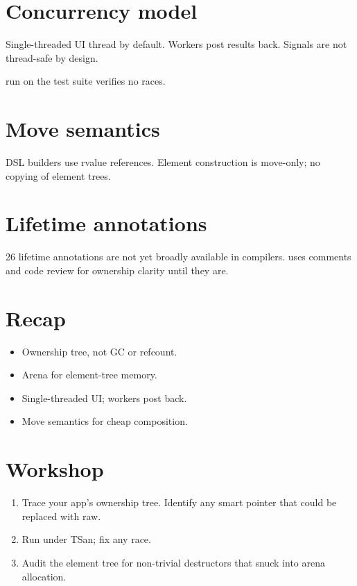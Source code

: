 \section{Concurrency model}

Single-threaded UI thread by default. Workers post results
back. Signals are not thread-safe by design.

 run on the test suite verifies no races.

\section{Move semantics}

DSL builders use rvalue references. Element construction
is move-only; no copying of element trees.

\section{Lifetime annotations}

\cpp{}26 lifetime annotations are not yet broadly available
in compilers. \maya{} uses comments and code review for
ownership clarity until they are.

\section{Recap}

\begin{recap}
\begin{itemize}[leftmargin=*]
  \item Ownership tree, not GC or refcount.
  \item Arena for element-tree memory.
  \item Single-threaded UI; workers post back.
  \item Move semantics for cheap composition.
\end{itemize}
\end{recap}

\section*{Workshop}

\begin{enumerate}[leftmargin=*]
  \item Trace your app's ownership tree. Identify any
    smart pointer that could be replaced with raw.
  \item Run under TSan; fix any race.
  \item Audit the element tree for non-trivial
    destructors that snuck into arena allocation.
\end{enumerate}
